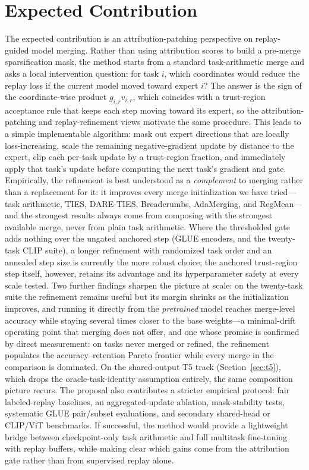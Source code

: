 \documentclass[11pt]{article}
\begin{document}
\section{Expected Contribution}
The expected contribution is an attribution-patching perspective on replay-guided model merging. Rather than using attribution scores to build a pre-merge sparsification mask, the method starts from a standard task-arithmetic merge and asks a local intervention question: for task $i$, which coordinates would reduce the replay loss if the current model moved toward expert $i$? The answer is the sign of the coordinate-wise product $g_{i,r}v_{i,r}$, which coincides with a trust-region acceptance rule that keeps each step moving toward its expert, so the attribution-patching and replay-refinement views motivate the same procedure. This leads to a simple implementable algorithm: mask out expert directions that are locally loss-increasing, scale the remaining negative-gradient update by distance to the expert, clip each per-task update by a trust-region fraction, and immediately apply that task's update before computing the next task's gradient and gate. Empirically, the refinement is best understood as a \emph{complement} to merging rather than a replacement for it: it improves every merge initialization we have tried---task arithmetic, TIES, DARE-TIES, Breadcrumbs, AdaMerging, and RegMean---and the strongest results always come from composing with the strongest available merge, never from plain task arithmetic. Where the thresholded gate adds nothing over the ungated anchored step (GLUE encoders, and the twenty-task CLIP suite), a longer refinement with randomized task order and an annealed step size is currently the more robust choice; the anchored trust-region step itself, however, retains its advantage and its hyperparameter safety at every scale tested. Two further findings sharpen the picture at scale: on the twenty-task suite the refinement remains useful but its margin shrinks as the initialization improves, and running it directly from the \emph{pretrained} model reaches merge-level accuracy while staying several times closer to the base weights---a minimal-drift operating point that merging does not offer, and one whose promise is confirmed by direct measurement: on tasks never merged or refined, the refinement populates the accuracy--retention Pareto frontier while every merge in the comparison is dominated. On the shared-output T5 track (Section~\ref{sec:t5}), which drops the oracle-task-identity assumption entirely, the same composition picture recurs. The proposal also contributes a stricter empirical protocol: fair labeled-replay baselines, an aggregated-update ablation, mask-stability tests, systematic GLUE pair/subset evaluations, and secondary shared-head or CLIP/ViT benchmarks. If successful, the method would provide a lightweight bridge between checkpoint-only task arithmetic and full multitask fine-tuning with replay buffers, while making clear which gains come from the attribution gate rather than from supervised replay alone.
\end{document}
